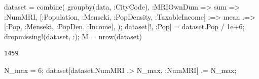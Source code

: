 \documentclass[
  letterpaper,
  DIV=11,
  numbers=noendperiod]{scrreprt}
\newenvironment{Shaded}{\begin{snugshade}}{\end{snugshade}}
\newcommand{\FloatTok}[1]{\textcolor[rgb]{0.68,0.00,0.00}{#1}}
\newcommand{\FunctionTok}[1]{\textcolor[rgb]{0.28,0.35,0.67}{#1}}
\newcommand{\NormalTok}[1]{\textcolor[rgb]{0.00,0.23,0.31}{#1}}
\newcommand{\OperatorTok}[1]{\textcolor[rgb]{0.37,0.37,0.37}{#1}}
\begin{document}
\begin{Shaded}
\begin{Highlighting}[]
\NormalTok{dataset }\OperatorTok{=} \FunctionTok{combine}\NormalTok{(}
    \FunctionTok{groupby}\NormalTok{(data, }\OperatorTok{:}\NormalTok{CityCode),}
    \OperatorTok{:}\NormalTok{MRIOwnDum }\OperatorTok{=\textgreater{}}\NormalTok{ sum }\OperatorTok{=\textgreater{}} \OperatorTok{:}\NormalTok{NumMRI,}
\NormalTok{    [}\OperatorTok{:}\NormalTok{Population, }\OperatorTok{:}\NormalTok{Menseki, }\OperatorTok{:}\NormalTok{PopDensity, }\OperatorTok{:}\NormalTok{TaxableIncome] }\OperatorTok{.=\textgreater{}}\NormalTok{ mean }\OperatorTok{.=\textgreater{}}\NormalTok{ [}\OperatorTok{:}\NormalTok{Pop, }\OperatorTok{:}\NormalTok{Menseki, }\OperatorTok{:}\NormalTok{PopDen, }\OperatorTok{:}\NormalTok{Income],   }
\NormalTok{);}
\NormalTok{dataset[!, }\OperatorTok{:}\NormalTok{Pop] }\OperatorTok{=}\NormalTok{ dataset.Pop }\OperatorTok{/} \FloatTok{1e+6}\NormalTok{;}
\FunctionTok{dropmissing!}\NormalTok{(dataset, }\OperatorTok{:}\NormalTok{);}
\NormalTok{M }\OperatorTok{=} \FunctionTok{nrow}\NormalTok{(dataset)}
\end{Highlighting}
\end{Shaded}

\begin{verbatim}
1459
\end{verbatim}

\begin{Shaded}
\begin{Highlighting}[]
\NormalTok{N\_max }\OperatorTok{=} \FloatTok{6}\NormalTok{;}
\NormalTok{dataset[dataset.NumMRI }\OperatorTok{.\textgreater{}}\NormalTok{ N\_max, }\OperatorTok{:}\NormalTok{NumMRI] }\OperatorTok{.=}\NormalTok{ N\_max;}
\end{Highlighting}
\end{Shaded}
\end{document}
